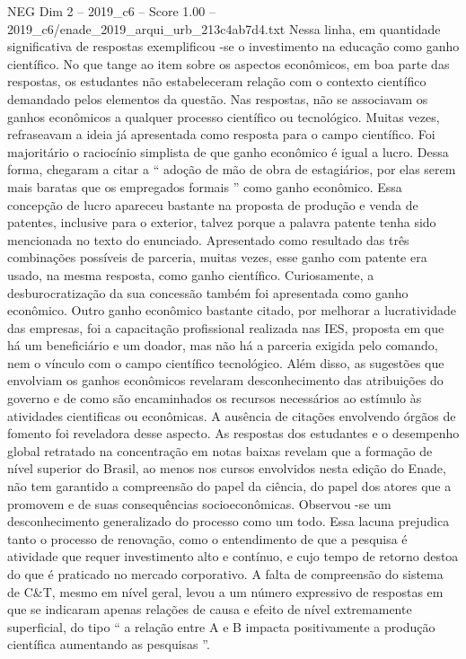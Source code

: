 \begin{textsample}{NEG Dim 2 – 2019\_c6 – Score 1.00 – 2019\_c6/enade\_2019\_arqui\_urb\_213c4ab7d4.txt}
Nessa linha, em quantidade significativa de respostas exemplificou -se o investimento na educação como ganho científico.
No que tange ao item sobre os aspectos econômicos, em boa parte das respostas, os estudantes não estabeleceram relação com o contexto científico demandado pelos elementos da questão.
Nas respostas, não se associavam os ganhos econômicos a qualquer processo científico ou tecnológico.
Muitas vezes, refraseavam a ideia já apresentada como resposta para o campo científico.
Foi majoritário o raciocínio simplista de que ganho econômico é igual a lucro.
Dessa forma, chegaram a citar a “ adoção de mão de obra de estagiários, por elas serem mais baratas que os empregados formais ” como ganho econômico.
Essa concepção de lucro apareceu bastante na proposta de produção e venda de patentes, inclusive para o exterior, talvez porque a palavra patente tenha sido mencionada no texto do enunciado.
Apresentado como resultado das três combinações possíveis de parceria, muitas vezes, esse ganho com patente era usado, na mesma resposta, como ganho científico.
Curiosamente, a desburocratização da sua concessão também foi apresentada como ganho econômico.
Outro ganho econômico bastante citado, por melhorar a lucratividade das empresas, foi a capacitação profissional realizada nas IES, proposta em que há um beneficiário e um doador, mas não há a parceria exigida pelo comando, nem o vínculo com o campo científico tecnológico.
Além disso, as sugestões que envolviam os ganhos econômicos revelaram desconhecimento das atribuições do governo e de como são encaminhados os recursos necessários ao estímulo às atividades cientificas ou econômicas.
A ausência de citações envolvendo órgãos de fomento foi reveladora desse aspecto.
As respostas dos estudantes e o desempenho global retratado na concentração em notas baixas revelam que a formação de nível superior do Brasil, ao menos nos cursos envolvidos nesta edição do Enade, não tem garantido a compreensão do papel da ciência, do papel dos atores que a promovem e de suas consequências socioeconômicas.
Observou -se um desconhecimento generalizado do processo como um todo.
Essa lacuna prejudica tanto o processo de renovação, como o entendimento de que a pesquisa é atividade que requer investimento alto e contínuo, e cujo tempo de retorno destoa do que é praticado no mercado corporativo.
A falta de compreensão do sistema de C\&T, mesmo em nível geral, levou a um número expressivo de respostas em que se indicaram apenas relações de causa e efeito de nível extremamente superficial, do tipo “ a relação entre A e B impacta positivamente a produção científica aumentando as pesquisas ”.

\end{textsample}
